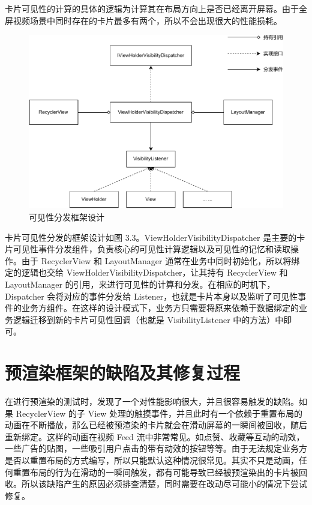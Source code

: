 卡片可见性的计算的具体的逻辑为计算其在布局方向上是否已经离开屏幕。由于全屏视频场景中同时存在的卡片最多有两个，所以不会出现很大的性能损耗。



\begin{figure}
    \centering
    \begin{adjustbox}{max width=\textwidth}
        \includegraphics{assets/visibility-dispatch-framework.pdf}
    \end{adjustbox}
    \caption{可见性分发框架设计}
\end{figure}


卡片可见性分发的框架设计如图 3.3。ViewHolderVisibilityDispatcher 是主要的卡片可见性事件分发组件，负责核心的可见性计算逻辑以及可见性的记忆和读取操作。由于 RecyclerView 和 LayoutManager 通常在业务中同时初始化，所以将绑定的逻辑也交给 ViewHolderVisibilityDispatcher，让其持有 RecyclerView 和 LayoutManager 的引用，来进行可见性的计算和分发。在相应的时机下，Dispatcher 会将对应的事件分发给 Listener，也就是卡片本身以及监听了可见性事件的业务方组件。在这样的设计模式下，业务方只需要将原来依赖于数据绑定的业务逻辑迁移到新的卡片可见性回调（也就是 VisibilityListener 中的方法）中即可。

\section{预渲染框架的缺陷及其修复过程}

在进行预渲染的测试时，发现了一个对性能影响很大，并且很容易触发的缺陷。如果 RecyclerView 的子 View 处理的触摸事件，并且此时有一个依赖于重置布局的动画在不断播放，那么已经被预渲染的卡片就会在滑动屏幕的一瞬间被回收，随后重新绑定。这样的动画在视频 Feed 流中非常常见。如点赞、收藏等互动的动效，一些广告的贴图，一些吸引用户点击的带有动效的按钮等等。由于无法规定业务方是否以重置布局的方式编写，所以只能默认这种情况很常见。其实不只是动画，任何重置布局的行为在滑动的一瞬间触发，都有可能导致已经被预渲染出的卡片被回收。所以该缺陷产生的原因必须排查清楚，同时需要在改动尽可能小的情况下尝试修复。

